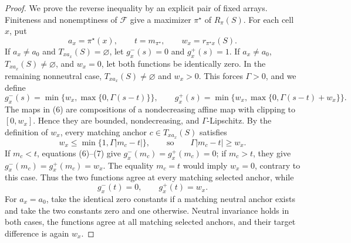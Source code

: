 \documentclass{article}
\begin{document}
\begin{proof}
We prove the reverse inequality by an explicit pair of fixed arrays.
Finiteness and nonemptiness of \(\mathcal F\) give a maximizer
\(\pi^\star\) of \(R_\pi(S)\).  For each cell \(x\), put
\[
a_x=\pi^\star(x),\qquad t=m_{\pi^\star},
\qquad w_x=r_{\pi^\star x}(S).
\]
If \(a_x\neq a_0\) and \(T_{x a_x}(S)=\varnothing\), let
\(g_x^-(s)=0\) and \(g_x^+(s)=1\).  If
\(a_x\neq a_0\), \(T_{x a_x}(S)\neq\varnothing\), and \(w_x=0\),
let both functions be identically zero.  In the remaining nonneutral case,
\(T_{x a_x}(S)\neq\varnothing\) and \(w_x>0\).  This forces
\(\Gamma>0\), and we define
\[
g_x^-(s)=\min\{w_x,\max\{0,\Gamma(s-t)\}\},
\qquad
g_x^+(s)=\min\{w_x,\max\{0,\Gamma(s-t)+w_x\}\}.                 \tag{6}
\]
The maps in (6) are compositions of a nondecreasing affine map with
clipping to \([0,w_x]\).  Hence they are bounded, nondecreasing, and
\(\Gamma\)-Lipschitz.  By the definition of \(w_x\), every matching
anchor \(c\in T_{x a_x}(S)\) satisfies
\[
w_x\leq \min\{1,\Gamma|m_c-t|\},
\qquad\text{so}\qquad \Gamma|m_c-t|\geq w_x.                    \tag{7}
\]
If \(m_c<t\), equations (6)--(7) give
\(g_x^-(m_c)=g_x^+(m_c)=0\); if \(m_c>t\), they give
\(g_x^-(m_c)=g_x^+(m_c)=w_x\).  The equality \(m_c=t\) would imply
\(w_x=0\), contrary to this case.  Thus the two functions agree at every
matching selected anchor, while
\[
g_x^-(t)=0,
\qquad
g_x^+(t)=w_x.                                                       \tag{8}
\]
For \(a_x=a_0\), take the identical zero constants if a matching neutral
anchor exists and take the two constants zero and one otherwise.  Neutral
invariance holds in both cases, the functions agree at all matching selected
anchors, and their target difference is again \(w_x\).


\end{proof}
\end{document}
